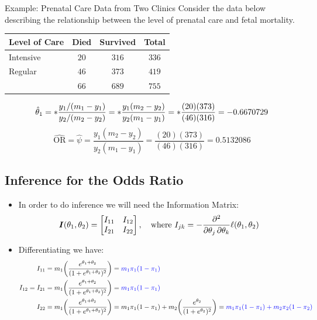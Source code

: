 \documentclass[oneside]{book}\usepackage[]{graphicx}\usepackage[svgnames]{xcolor}
\let\log\relax%
\providecommand{\Matrix}[1]{\bm{#1}}
\begin{document}
\begin{Example}{Example: Prenatal Care Data from Two Clinics}
    Consider the data below describing the relationship between the level of prenatal care
    and fetal mortality.
    \begin{center}
        \begin{NiceTabular}{l|cc|c}
            Level of Care & Died                            & Survived & Total                                        \\
            \midrule
            Intensive & $ 20 $                            & $ 316 $                 & $ 336 $         \\
            Regular   & $ 46 $                            & $ 373 $                 & $ 419 $         \\
            \midrule
            & $ 66 $                    & $ 689 $ & $ 755 $
        \end{NiceTabular}
    \end{center}
\end{Example}
\[ \hat{\theta}_1=\log*{\frac{y_1/(m_1-y_1)}{y_2/(m_2-y_2)}}=\log*{\frac{y_1(m_2-y_2)}{y_2(m_1-y_1)}}=\log*{\frac{(20)(373)}{(46)(316)}}=-0.6670729 \]
\[ \widehat{\text{OR}}=\hat{\psi}=\frac{y_1(m_2-y_2)}{y_2(m_1-y_1)}=\frac{(20)(373)}{(46)(316)}=0.5132086 \]
\subsection*{Inference for the Odds Ratio}
\begin{itemize}
    \item In order to do inference we will need the Information Matrix:
          \[ \Matrix{I}(\theta_1,\theta_2)=\begin{bmatrix}
                  I_{11} & I_{12} \\
                  I_{21} & I_{22}
              \end{bmatrix},\quad\text{where $I_{jk}=-\pdv*{\ell(\theta_1,\theta_2)}{\theta_j,\theta_k}$} \]
    \item Differentiating we have:
          \begin{align*}
              I_{11}          & =m_1\biggl(\frac{e^{\theta_1+\theta_2}}{(1+e^{\theta_1+\theta_2})^{2}} \biggr)=\textcolor{Blue}{m_1\pi_1(1-\pi_1)}                                                                                                 \\
              I_{12}  =I_{21} & =m_1\biggl(\frac{e^{\theta_1+\theta_2}}{(1+e^{\theta_1+\theta_2})^{2}} \biggr)=\textcolor{Blue}{m_1\pi_1(1-\pi_1)}                                                                                                 \\
              I_{22}          & =m_1\biggl(\frac{e^{\theta_1+\theta_2}}{(1+e^{\theta_1+\theta_2})^{2}} \biggr)=m_1\pi_1(1-\pi_1)+m_2\biggl(\frac{e^{\theta_2}}{(1+e^{\theta_2})^{2}} \biggr)=\textcolor{Blue}{m_1\pi_1(1-\pi_1)+m_2\pi_2(1-\pi_2)}
          \end{align*}
\end{itemize}
\end{document}
